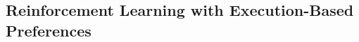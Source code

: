 


\subsection{Reinforcement Learning with Execution-Based Preferences}\label{reinforcement_learning}

